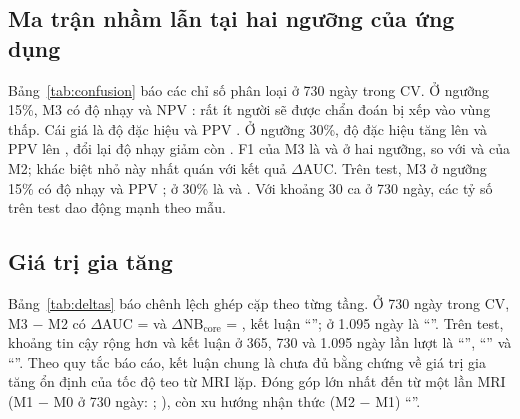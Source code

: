 \documentclass[journal]{IEEEtran}
\begin{document}
\subsection{Ma trận nhầm lẫn tại hai ngưỡng của ứng dụng}
Bảng~\ref{tab:confusion} báo các chỉ số phân loại ở 730 ngày trong CV. Ở ngưỡng 15\%, M3 có độ nhạy  và NPV : rất ít người sẽ được chẩn đoán bị xếp vào vùng thấp. Cái giá là độ đặc hiệu  và PPV . Ở ngưỡng 30\%, độ đặc hiệu tăng lên  và PPV lên , đổi lại độ nhạy giảm còn . F1 của M3 là  và  ở hai ngưỡng, so với  và  của M2; khác biệt nhỏ này nhất quán với kết quả $\Delta$AUC. Trên test, M3 ở ngưỡng 15\% có độ nhạy  và PPV ; ở 30\% là  và . Với khoảng 30 ca ở 730 ngày, các tỷ số trên test dao động mạnh theo mẫu.

\begin{table}[t]
\caption{Chỉ số phân loại có trọng số IPCW ở 730 ngày (CV, tập ghép cặp). Gắn cờ: tỷ lệ người có nguy cơ dự báo $\geq$ ngưỡng}\label{tab:confusion}
\centering\footnotesize

\end{table}

\subsection{Giá trị gia tăng}
Bảng~\ref{tab:deltas} báo chênh lệch ghép cặp theo từng tầng. Ở 730 ngày trong CV, M3 − M2 có $\Delta$AUC =   và $\Delta\mathrm{NB}_{\text{core}}$ =  , kết luận ``''; ở 1.095 ngày là ``''. Trên test, khoảng tin cậy rộng hơn và kết luận ở 365, 730 và 1.095 ngày lần lượt là ``'', ``'' và ``''. Theo quy tắc báo cáo, kết luận chung là chưa đủ bằng chứng về giá trị gia tăng ổn định của tốc độ teo từ MRI lặp. Đóng góp lớn nhất đến từ một lần MRI (M1 − M0 ở 730 ngày: ; ), còn xu hướng nhận thức (M2 − M1) ``''.

\begin{table}[t]
\caption{Chênh lệch ghép cặp (KTC 95\% bootstrap cụm người)}\label{tab:deltas}
\centering\footnotesize

\end{table}
\end{document}
